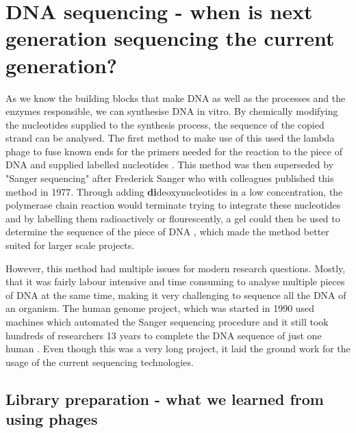 \section[DNA sequencing]{DNA sequencing - when is next generation sequencing the current generation?}
\label{intro-sec:sequencing}

As we know the building blocks that make DNA as well as the processes and the enzymes responsible, we can synthesise DNA in vitro. By chemically modifying the nucleotides supplied to the synthesis process, the sequence of the copied strand can be analysed. The first method to make use of this used the lambda phage to fuse known ends for the primers needed for the reaction to the piece of DNA and supplied labelled nucleotides \cite{Padmanabhan1974}. This method was then superseded by "Sanger sequencing" after Frederick Sanger who with colleagues published this method in 1977. Through adding \textbf{di}deoxynucleotides in a low concentration, the polymerase chain reaction would terminate trying to integrate these nucleotides and by labelling them radioactively or flourescently, a gel could then be used to determine the sequence of the piece of DNA \cite{Sanger1975,Sanger1977}, which made the method better suited for larger scale projects.

However, this method had multiple issues for modern research questions. Mostly, that it was fairly labour intensive and time consuming to analyse multiple pieces of DNA at the same time, making it very challenging to sequence all the DNA of an organism. The human genome project, which was started in 1990 used machines which automated the Sanger sequencing procedure and it still took hundreds of researchers 13 years to complete the DNA sequence of just one human \cite{Lander2001,Venter2001}. Even though this was a very long project, it laid the ground work for the usage of the current sequencing technologies.

\subsection[Library preparation]{Library preparation - what we learned from using phages}
\label{intro-sec:libraryprep}

